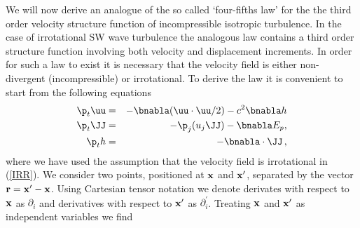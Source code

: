 We will now derive an analogue of the so called `four-fifths  law' \cite[]{Kolmogorov1941} for the the third order velocity structure function of incompressible isotropic turbulence.   In the case of irrotational SW wave turbulence the analogous law contains a third order structure function involving both velocity and displacement increments.  In order for such a law to exist it is necessary that the velocity field is either non-divergent (incompressible) or irrotational. To derive the law it is convenient to start from the following equations
\begin{eqnarray} \label{IRR}
\p_t \uu &=& -\bnabla  (\uu \cdot \uu /2) - c^2 \bnabla h  \\
\p_t \JJ &=& -\p_j (u_j \JJ) - \bnabla E_p,\\
\p_t h   &=& -\bnabla \cdot \JJ \, ,
\end{eqnarray}
where we have used the  assumption that the velocity field is irrotational in (\ref{IRR}). We consider two points, positioned at $ \bf x $ and $ {\bf x}^\prime $, separated by the vector $ {\bf r} = {\bf x}^\prime - {\bf x} $.
Using Cartesian tensor notation we denote derivates with respect to $ {\bf x} $ as $ \partial_i $ and derivatives with respect to $ {\bf x}^\prime $ as $ \partial^{\prime}_i $. Treating $ \bf x $ and $ {\bf x}^\prime $ as independent variables we find

